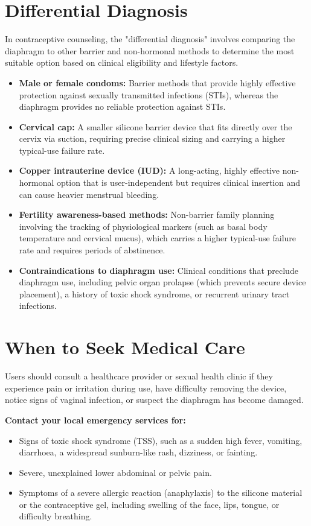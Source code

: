 \section*{Differential Diagnosis}
In contraceptive counseling, the "differential diagnosis" involves comparing the diaphragm to other barrier and non-hormonal methods to determine the most suitable option based on clinical eligibility and lifestyle factors.

\begin{itemize}
    \item \textbf{Male or female condoms:} Barrier methods that provide highly effective protection against sexually transmitted infections (STIs), whereas the diaphragm provides no reliable protection against STIs.
    \item \textbf{Cervical cap:} A smaller silicone barrier device that fits directly over the cervix via suction, requiring precise clinical sizing and carrying a higher typical-use failure rate.
    \item \textbf{Copper intrauterine device (IUD):} A long-acting, highly effective non-hormonal option that is user-independent but requires clinical insertion and can cause heavier menstrual bleeding.
    \item \textbf{Fertility awareness-based methods:} Non-barrier family planning involving the tracking of physiological markers (such as basal body temperature and cervical mucus), which carries a higher typical-use failure rate and requires periods of abstinence.
    \item \textbf{Contraindications to diaphragm use:} Clinical conditions that preclude diaphragm use, including pelvic organ prolapse (which prevents secure device placement), a history of toxic shock syndrome, or recurrent urinary tract infections.
\end{itemize}

\section*{When to Seek Medical Care}
Users should consult a healthcare provider or sexual health clinic if they experience pain or irritation during use, have difficulty removing the device, notice signs of vaginal infection, or suspect the diaphragm has become damaged.

\textbf{Contact your local emergency services for:}
\begin{itemize}
    \item Signs of toxic shock syndrome (TSS), such as a sudden high fever, vomiting, diarrhoea, a widespread sunburn-like rash, dizziness, or fainting.
    \item Severe, unexplained lower abdominal or pelvic pain.
    \item Symptoms of a severe allergic reaction (anaphylaxis) to the silicone material or the contraceptive gel, including swelling of the face, lips, tongue, or difficulty breathing.
\end{itemize}

